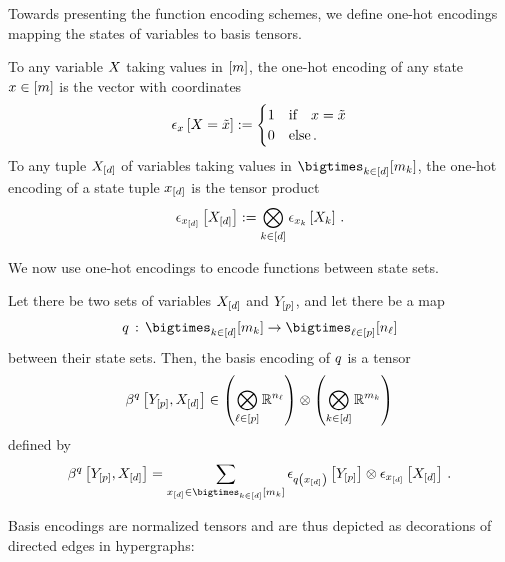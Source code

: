 Towards presenting the function encoding schemes, we define one-hot encodings mapping the states of variables to basis tensors.

\begin{definition}
    \label{def:onehotenc}
    To any variable $X$ taking values in $[m]$, the one-hot encoding of any state $x\in[m]$ is the vector with coordinates
    \begin{align*}
        \epsilon_{x}\left[X=\tilde{x}\right]
        := \begin{cases}
                      1 & \text{if}\quad x=\tilde{x} \\
                      0 & \text{else} \, .
        \end{cases}
    \end{align*}
    To any tuple $X_{[d]}$ of variables taking values in $\facstates$, the one-hot encoding of a state tuple $x_{[d]}$ is the tensor product
    \begin{align*}
        \epsilon_{x_{[d]}}\left[X_{[d]}\right]
        := \bigotimes_{k\in[d]} \epsilon_{x_{k}}\left[X_{k}\right] \, .
    \end{align*}
\end{definition}

We now use one-hot encodings to encode functions between state sets.

\begin{definition}
    \label{def:functionRepresentation}
    Let there be two sets of variables $X_{[d]}$ and $Y_{[p]}$, and let there be a map
    \begin{align*}
        \statesetfunction\defcols\facstates \rightarrow  \bigtimes_{\selindexin}[\headdimof{\selindex}]
    \end{align*}
    between their state sets.
    Then, the basis encoding of $q$ is a tensor
    \begin{align*}
        \bencodingofat{\statesetfunction}{\headvariables,\shortcatvariables}
        \in \left(\bigotimes_{\selindexin}\rr^{\headdimof{\selindex}}\right) \otimes \left(\facspace\right)
    \end{align*}
    defined by
    \begin{align*}
        \bencodingofat{\statesetfunction}{\headvariables,\shortcatvariables}
        = \sum_{\shortcatindices\in\facstates}
        \onehotmapofat{\statesetfunctionev{\shortcatindices}}{\headvariables} \otimes  \onehotmapofat{\shortcatindices}{\shortcatvariables} \, .
    \end{align*}
\end{definition}
Basis encodings are normalized tensors and are thus depicted as decorations of directed edges in hypergraphs:
\begin{center}
    
\end{center}

